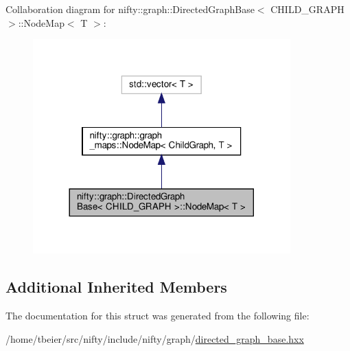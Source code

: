 Collaboration diagram for nifty\+:\+:graph\+:\+:Directed\+Graph\+Base$<$ C\+H\+I\+L\+D\+\_\+\+G\+R\+A\+PH $>$\+:\+:Node\+Map$<$ T $>$\+:
\nopagebreak
\begin{figure}[H]
\begin{center}
\leavevmode
\includegraphics[width=281pt]{structnifty_1_1graph_1_1DirectedGraphBase_1_1NodeMap__coll__graph}
\end{center}
\end{figure}
\subsection*{Additional Inherited Members}


The documentation for this struct was generated from the following file\+:\begin{DoxyCompactItemize}
\item 
/home/tbeier/src/nifty/include/nifty/graph/\hyperlink{directed__graph__base_8hxx}{directed\+\_\+graph\+\_\+base.\+hxx}\end{DoxyCompactItemize}
